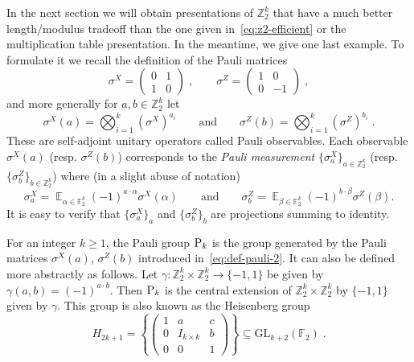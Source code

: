 \documentclass[11pt]{article}
\theoremstyle{definition}
\DeclareMathOperator*{\Expectation}{\mathbb{E}}
\newcommand{\Es}[1]{\Expectation_{#1}}
\newcommand{\F}{\ensuremath{\mathbb{F}}}
\newcommand{\Z}{\ensuremath{\mathbb{Z}}}
\newcommand{\gamestyle}[1]{\ensuremath{\textsc{#1}}\xspace}
\newcommand{\pauli}{\gamestyle{P}}
\begin{document}
In the next section we will obtain presentations of $\Z_2^k$ that have a much better length/modulus tradeoff than the one given in~\eqref{eq:z2-efficient} or the multiplication table presentation. In the meantime, we give one last example. To formulate it we recall the definition of the Pauli matrices
	\begin{equation}\label{eq:def-pauli-1} \sigma^X = \begin{pmatrix} 0 & 1 \\ 1 & 0 \end{pmatrix}\;,\qquad \sigma^Z = \begin{pmatrix} 1 & 0 \\ 0 & -1\end{pmatrix}\;,
	\end{equation}
	and more generally for $a,b\in \Z_2^k$ let 
	\begin{equation}\label{eq:def-pauli-2}
	\sigma^X(a) = \bigotimes_{i=1}^k (\sigma^X)^{a_i}\qquad\text{and}\qquad\sigma^Z(b) = \bigotimes_{i=1}^k (\sigma^Z)^{b_i}\;.
	\end{equation}
These are self-adjoint unitary operators called Pauli observables. Each observable $\sigma^X(a)$ (resp. $\sigma^Z(b)$) corresponds to the \emph{Pauli measurement} $\{ \sigma^X_a \}_{a \in \Z_2^k}$ (resp. $\{ \sigma^Z_b \}_{b \in \Z_2^k}$) where (in a slight abuse of notation)  
	\[    \sigma^X_a = \Es{\alpha\in\F_2^k} (-1)^{a\cdot \alpha} \sigma^X(\alpha)\qquad\text{and}\qquad\sigma^Z_b = \Es{\beta\in\F_2^k} (-1)^{b\cdot\beta} \sigma^Z(\beta).\]
	It is easy to verify that $\{\sigma^X_a\}_a$ and $\{\sigma^Z_b\}_b$ are projections summing to identity.	
	
For an integer $k\geq 1$,  the Pauli group $\pauli_k$ is the group generated by the Pauli matrices $\sigma^X(a)$, $\sigma^Z(b)$ introduced in~\eqref{eq:def-pauli-2}. It can also be defined more abstractly as follows. Let $\gamma: \Z_2^k\times \Z_2^k \to \{-1,1\}$ be given by $\gamma(a,b)=(-1)^{a\cdot b}$. Then $\pauli_k$ is the central extension of $\Z_2^k\times \Z_2^k$ by $\{-1,1\}$ given by $\gamma$. This group 
is also known as the Heisenberg group 
\begin{equation}\label{eq:defn_Pauli_as_Heisenberg} H_{2k+1} = \left \{ \begin{pmatrix} 1 & a & c \\ 0 & I_{k \times k} & b \\ 0 & 0 & 1 \end{pmatrix} \right\}\subseteq {\mathrm{GL}}_{k+2}(\F_2)\;.
\end{equation}
 
\end{document}
